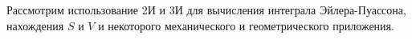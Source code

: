 \documentclass[../../main.tex]{subfiles}
\begin{document}
	Рассмотрим использование 2И и 3И для вычисления интеграла Эйлера-Пуассона, 
	нахождения $S$ и $V$ и некоторого механического и геометрического приложения.
\end{document}
